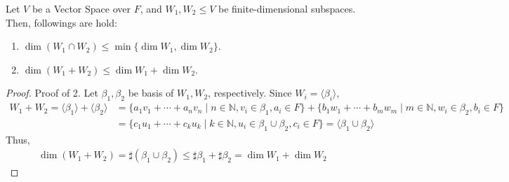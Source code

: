 \begin{theorem}
    Let $V$ be a Vector Space over $F$, and $W_1, W_2 \leq V$ be finite-dimensional subspaces. \\
    Then, followings are hold:
    \begin{enumerate}
        \item $\dim(W_1 \cap W_2) \leq \min\{\dim W_1, \dim W_2 \}$.
        \item $\dim(W_1 + W_2) \leq \dim W_1 + \dim W_2$.
    \end{enumerate}
\end{theorem}
\begin{proof}
    Proof of 2. Let $\beta_1, \beta_2$ be basis of $W_1, W_2$, respectively.
    Since $W_i = \langle \beta_i \rangle$,
    \begin{align*}
        W_1 + W_2 = \langle \beta_1 \rangle + \langle \beta_2 \rangle
        &= \{a_1 v_1 + \cdots + a_n v_n \mid n \in \mathbb{N}, v_i \in \beta_1, a_i \in F\}
        + \{b_1 w_1 + \cdots + b_m w_m \mid m \in \mathbb{N}, w_i \in \beta_2, b_i \in F\} \\
        &= \{c_1 u_1 + \cdots + c_k u_k \mid k \in \mathbb{N}, u_i \in \beta_1 \cup \beta_2, c_i \in F\}
        = \langle \beta_1 \cup \beta_2 \rangle
    \end{align*}
    Thus,
    \begin{align*}
        \dim(W_1 + W_2) = \sharp(\beta_1 \cup \beta_2) \leq \sharp \beta_1 + \sharp \beta_2 = \dim W_1 + \dim W_2
    \end{align*}
\end{proof}

